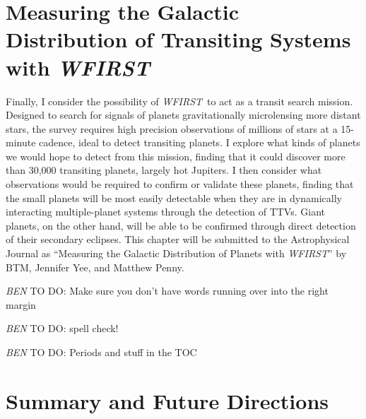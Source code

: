 \documentclass[12pt]{caltech_thesis}
\newcommand{\todo}[3]{{\color{#2} \emph{#1} TO DO: #3}}
\newcommand{\btmtodo}[1]{\todo{BEN}{red}{#1}}
\newcommand{\WF}{{\textit {WFIRST}}}
\begin{document}


\chapter{Measuring the Galactic Distribution of Transiting Systems with \WF}
\label{chap:wfirst}
Finally, I consider the possibility of \WF\ to act as a transit search mission.
Designed to search for signals of planets gravitationally microlensing more distant stars, the survey
requires high precision observations of millions of stars at a 15-minute cadence, ideal to detect
transiting planets.
I explore what kinds of planets we would hope to detect from this mission, finding that it could discover more than 30,000
transiting planets, largely hot Jupiters.
I then consider what observations would be required to confirm or validate these planets, finding that the small planets
will be most easily detectable when they are in dynamically interacting multiple-planet systems through the detection of
TTVs.
Giant planets, on the other hand, will be able to be confirmed through direct detection of their secondary eclipses.
This chapter will be submitted to the Astrophysical Journal as ``Measuring the Galactic Distribution of Planets with \WF'' by
BTM, Jennifer Yee, and Matthew Penny.






\btmtodo{Make sure you don't have words running over into the right margin}

\btmtodo{spell check!}

\btmtodo{Periods and stuff in the TOC}



\chapter{Summary and Future Directions}
\label{chap:summary}





\printbibliography[]
%





\end{document}
